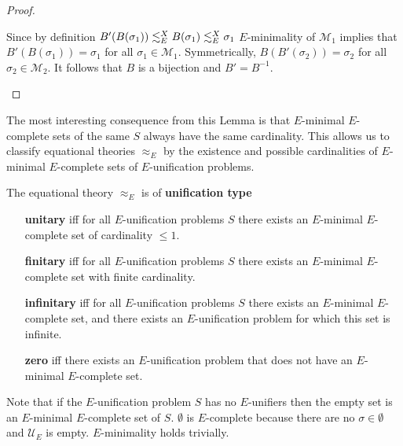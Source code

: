 \begin{proof}
\begin{center}
\end{center}
Since by definition $B'(B(\sigma_1))\lesssim^X_E B(\sigma_1)\lesssim^X_E\sigma_1$ $E$-minimality of $\mathcal{M}_1$ implies that $B'(B(\sigma_1))=\sigma_1$ for all $\sigma_1\in\mathcal{M}_1$. Symmetrically, $B(B'(\sigma_2))=\sigma_2$ for all $\sigma_2\in\mathcal{M}_2$. It follows that $B$ is a bijection and $B'=B^{-1}$.
\begin{center}
\end{center}
\end{proof}
The most interesting consequence from this Lemma is that $E$-minimal $E$-complete sets of the same $S$ always have the same cardinality. This allows us to classify equational theories $\approx_E$ by the existence and possible cardinalities of $E$-minimal $E$-complete sets of $E$-unification problems.
\begin{definition}
The equational theory $\approx_E$ is of \textbf{unification type}
\begin{itemize}
\item[\textbf{unitary}] iff for all $E$-unification problems $S$ there exists an $E$-minimal $E$-complete set of cardinality $\leq 1$.
\item[\textbf{finitary}] iff for all $E$-unification problems $S$ there exists an $E$-minimal $E$-complete set with finite cardinality.
\item[\textbf{infinitary}] iff for all $E$-unification problems $S$ there exists an $E$-minimal $E$-complete set, and there exists an $E$-unification problem for which this set is infinite.
\item[\textbf{zero}] iff there exists an $E$-unification problem that does not have an $E$-minimal $E$-complete set.
\end{itemize}
\end{definition}
Note that if the $E$-unification problem $S$ has no $E$-unifiers then the empty set is an $E$-minimal $E$-complete set of $S$. $\emptyset$ is $E$-complete because there are no $\sigma\in\emptyset$ and $\mathcal{U}_E$ is empty. $E$-minimality holds trivially.